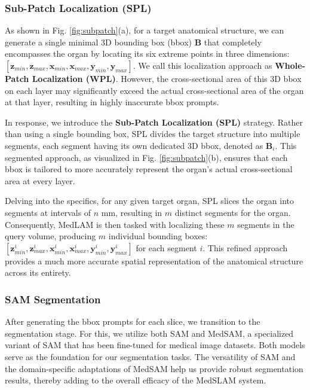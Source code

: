 \documentclass[times,twocolumn,final]{elsarticle}
\begin{document}
\subsubsection{Sub-Patch Localization (SPL)}
\par  As shown in Fig. \ref{fig:subpatch}(a), for a target anatomical structure, we can generate a single minimal 3D bounding box (bbox) $\bm{B}$ that completely encompasses the organ by locating its six extreme points in three dimensions:  $[\bm{z}_{min}, \bm{z}_{max}, \bm{x}_{min}, \bm{x}_{max}, \bm{y}_{min}, \bm{y}_{max}]$. We call this localization approach as \textbf{Whole-Patch Localization (WPL)}. However, the cross-sectional area of this 3D bbox on each layer may significantly exceed the actual cross-sectional area of the organ at that layer, resulting in highly inaccurate bbox prompts.
\par In response, we introduce the \textbf{Sub-Patch Localization (SPL)} strategy. Rather than using a single bounding box, SPL divides the target structure into multiple segments, each segment having its own dedicated 3D bbox, denoted as $\bm{B}_i$. This segmented approach, as visualized in Fig. \ref{fig:subpatch}(b), ensures that each bbox is tailored to more accurately represent the organ's actual cross-sectional area at every layer.
\par Delving into the specifics, for any given target organ, SPL slices the organ into segments at intervals of $n$ mm, resulting in $m$ distinct segments for the organ. Consequently, MedLAM is then tasked with localizing these $m$ segments in the query volume, producing $m$ individual bounding boxes: $[\bm{z}^i_{min}, \bm{z}^i_{max}, \bm{x}^i_{min}, \bm{x}^i_{max}, \bm{y}^i_{min}, \bm{y}^i_{max}]$ for each segment $i$. This refined approach provides a much more accurate spatial representation of the anatomical structure across its entirety.

\subsubsection{SAM Segmentation}
\par After generating the bbox prompts for each slice, we transition to the segmentation stage. For this, we utilize both SAM and MedSAM, a specialized variant of SAM that has been fine-tuned for medical image datasets. Both models serve as the foundation for our segmentation tasks. The versatility of SAM and the domain-specific adaptations of MedSAM help us provide robust segmentation results, thereby adding to the overall efficacy of the MedSLAM system. 
\end{document}
